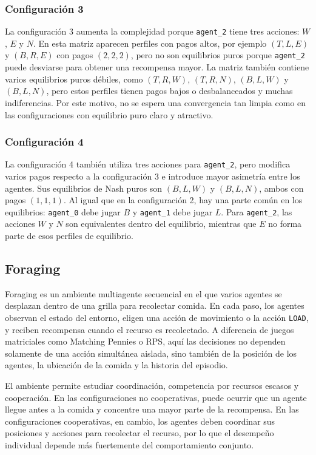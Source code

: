 \documentclass[letterpaper,12pt]{article} %
\begin{document}
\subsubsection*{Configuración 3}

La configuración 3 aumenta la complejidad porque \texttt{agent\_2} tiene tres acciones: $W$, $E$ y $N$. En esta matriz aparecen perfiles con pagos altos, por ejemplo $(T,L,E)$ y $(B,R,E)$ con pagos $(2,2,2)$, pero no son equilibrios puros porque \texttt{agent\_2} puede desviarse para obtener una recompensa mayor. La matriz también contiene varios equilibrios puros débiles, como $(T,R,W)$, $(T,R,N)$, $(B,L,W)$ y $(B,L,N)$, pero estos perfiles tienen pagos bajos o desbalanceados y muchas indiferencias. Por este motivo, no se espera una convergencia tan limpia como en las configuraciones con equilibrio puro claro y atractivo.

\subsubsection*{Configuración 4}

La configuración 4 también utiliza tres acciones para \texttt{agent\_2}, pero modifica varios pagos respecto a la configuración 3 e introduce mayor asimetría entre los agentes. Sus equilibrios de Nash puros son $(B,L,W)$ y $(B,L,N)$, ambos con pagos $(1,1,1)$. Al igual que en la configuración 2, hay una parte común en los equilibrios: \texttt{agent\_0} debe jugar $B$ y \texttt{agent\_1} debe jugar $L$. Para \texttt{agent\_2}, las acciones $W$ y $N$ son equivalentes dentro del equilibrio, mientras que $E$ no forma parte de esos perfiles de equilibrio.


\subsection{Foraging}

Foraging es un ambiente multiagente secuencial en el que varios agentes se desplazan dentro de una grilla para recolectar comida. En cada paso, los agentes observan el estado del entorno, eligen una acción de movimiento o la acción \texttt{LOAD}, y reciben recompensa cuando el recurso es recolectado. A diferencia de juegos matriciales como Matching Pennies o RPS, aquí las decisiones no dependen solamente de una acción simultánea aislada, sino también de la posición de los agentes, la ubicación de la comida y la historia del episodio.

El ambiente permite estudiar coordinación, competencia por recursos escasos y cooperación. En las configuraciones no cooperativas, puede ocurrir que un agente llegue antes a la comida y concentre una mayor parte de la recompensa. En las configuraciones cooperativas, en cambio, los agentes deben coordinar sus posiciones y acciones para recolectar el recurso, por lo que el desempeño individual depende más fuertemente del comportamiento conjunto.
\end{document}
